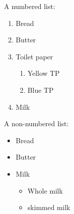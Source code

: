 \documentclass{article}
\begin{document}
    A numbered list:
    \begin{enumerate}
      \item Bread
      \item Butter
      \item Toilet paper
        \begin{enumerate}
          \item Yellow TP
          \item Blue TP
        \end{enumerate}
      \item Milk
    \end{enumerate}

    A non-numbered list:
    \begin{itemize}
      \item Bread
      \item Butter
      \item Milk
        \begin{itemize}
          \item Whole milk 
          \item skimmed milk
        \end{itemize}
    \end{itemize}
\end{document}
